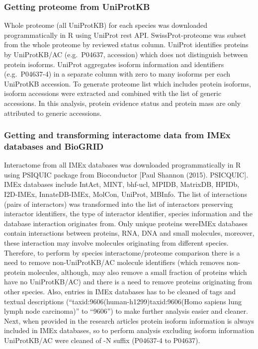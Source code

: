 \documentclass[]{article}
\begin{document}
\subsubsection{Getting proteome from
UniProtKB}\label{getting-proteome-from-uniprotkb}

Whole proteome (all UniProtKB) for each species was downloaded
programmatically in R using UniProt rest API. SwissProt-proteome was
subset from the whole proteome by reviewed status column. UniProt
identifies proteins by UniProtKB/AC (e.g.~P04637, accession) which does
not distinguish between protein isoforms. UniProt aggregates isoform
information and identifiers (e.g.~P04637-4) in a separate column with
zero to many isoforms per each UniProtKB accession. To generate proteome
list which includes protein isoforms, isoform accessions were extracted
and combined with the list of generic accessions. In this analysis,
protein evidence status and protein mass are only attributed to generic
accessions.

\subsubsection{Getting and transforming interactome data from IMEx
databases and
BioGRID}\label{getting-and-transforming-interactome-data-from-imex-databases-and-biogrid}

Interactome from all IMEx databases was downloaded programmatically in R
using PSIQUIC package from Bioconductor {[}Paul Shannon (2015).
PSICQUIC{]}. IMEx databases include IntAct, MINT, bhf-ucl, MPIDB,
MatrixDB, HPIDb, I2D-IMEx, InnateDB-IMEx, MolCon, UniProt, MBInfo. The
list of interactions (pairs of interactors) was transformed into the
list of interactors preserving interactor identifiers, the type of
interactor identifier, species information and the database interaction
originates from. Only unique proteins wereIMEx databases contain
interactions between proteins, RNA, DNA and small molecules, moreover,
these interaction may involve molecules originating from different
species. Therefore, to perform by species interactome/proteome
comparison there is a need to remove non-UniProtKB/AC molecule
identifiers (which removes non-protein molecules, although, may also
remove a small fraction of proteins which have no UniProtKB/AC) and
there is a need to remove proteins originating from other species. Also,
entries in IMEx databases has to be cleaned of tags and textual
descriptions (``taxid:9606(human-h1299)\textbar{}taxid:9606(Homo sapiens
lung lymph node carcinoma)'' to ``9606'') to make further analysis
easier and cleaner. Next, when provided in the research articles protein
isoform information is always included in IMEx databases, so to perform
analysis excluding isoform information UniProtKB/AC were cleaned of -N
suffix (P04637-4 to P04637).
\end{document}
